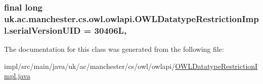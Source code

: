 \hypertarget{classuk_1_1ac_1_1manchester_1_1cs_1_1owl_1_1owlapi_1_1_o_w_l_datatype_restriction_impl_a5acedb98ea3663df4fa2679d427ddabd}{
\subsubsection[{serial\-Version\-U\-I\-D}]{\setlength{\rightskip}{0pt plus 5cm}final long uk.\-ac.\-manchester.\-cs.\-owl.\-owlapi.\-O\-W\-L\-Datatype\-Restriction\-Impl.\-serial\-Version\-U\-I\-D = 30406\-L\hspace{0.3cm}{\ttfamily [static]}, {\ttfamily [private]}}}\label{classuk_1_1ac_1_1manchester_1_1cs_1_1owl_1_1owlapi_1_1_o_w_l_datatype_restriction_impl_a5acedb98ea3663df4fa2679d427ddabd}


The documentation for this class was generated from the following file\-:\begin{DoxyCompactItemize}
\item 
impl/src/main/java/uk/ac/manchester/cs/owl/owlapi/\hyperlink{_o_w_l_datatype_restriction_impl_8java}{O\-W\-L\-Datatype\-Restriction\-Impl.\-java}\end{DoxyCompactItemize}
